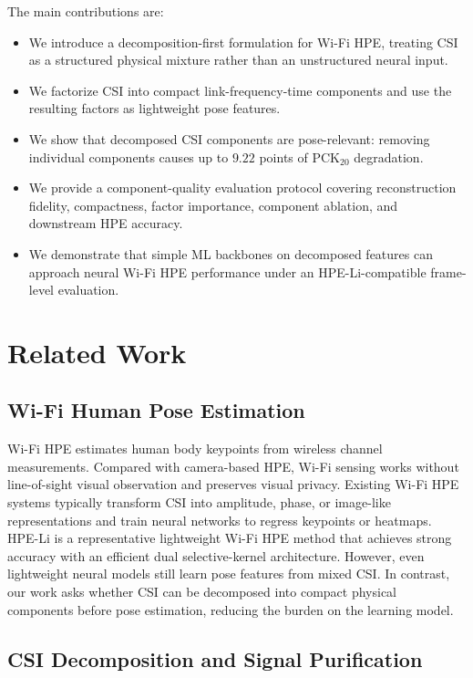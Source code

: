 The main contributions are:
\begin{itemize}
    \item We introduce a decomposition-first formulation for Wi-Fi HPE, treating CSI as a structured physical mixture rather than an unstructured neural input.
    \item We factorize CSI into compact link-frequency-time components and use the resulting factors as lightweight pose features.
    \item We show that decomposed CSI components are pose-relevant: removing individual components causes up to $9.22$ points of PCK$_{20}$ degradation.
    \item We provide a component-quality evaluation protocol covering reconstruction fidelity, compactness, factor importance, component ablation, and downstream HPE accuracy.
    \item We demonstrate that simple ML backbones on decomposed features can approach neural Wi-Fi HPE performance under an HPE-Li-compatible frame-level evaluation.
\end{itemize}

\section{Related Work}

\subsection{Wi-Fi Human Pose Estimation}

Wi-Fi HPE estimates human body keypoints from wireless channel measurements. Compared with camera-based HPE, Wi-Fi sensing works without line-of-sight visual observation and preserves visual privacy. Existing Wi-Fi HPE systems typically transform CSI into amplitude, phase, or image-like representations and train neural networks to regress keypoints or heatmaps. HPE-Li is a representative lightweight Wi-Fi HPE method that achieves strong accuracy with an efficient dual selective-kernel architecture. However, even lightweight neural models still learn pose features from mixed CSI. In contrast, our work asks whether CSI can be decomposed into compact physical components before pose estimation, reducing the burden on the learning model.

\subsection{CSI Decomposition and Signal Purification}

